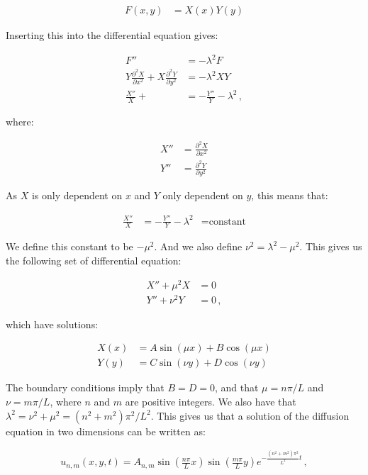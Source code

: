 \documentclass[reprint,english,notitlepage]{revtex4-1}  %
\begin{document}
\begin{align*}
F(x,y) &= X(x) Y(y)
\end{align*}

Inserting this into the differential equation gives:

\begin{align*}
F'' &= -\lambda^2 F \\
Y \frac{\partial^2 X}{\partial x^2} + X \frac{\partial^2 Y}{\partial y^2} &= -\lambda^2 XY \\
\frac{X''}{X} +  &= - \frac{Y''}{Y} - \lambda^2 \, ,
\end{align*}

where:

\begin{align*}
X'' &= \frac{\partial^2 X}{\partial x^2} \\
Y'' &= \frac{\partial^2 Y}{\partial y^2}
\end{align*}

As $X$ is only dependent on $x$ and $Y$ only dependent on $y$, this means that:

\begin{align*}
\frac{X''}{X} &= - \frac{Y''}{Y} - \lambda^2 &= \text{constant}
\end{align*}

We define this constant to be $-\mu^2$. And we also define $\nu^2 = \lambda^2 - \mu^2$. This gives us the following set of differential equation:

\begin{align*}
X'' + \mu^2 X &= 0 \\
Y'' + \nu^2 Y &= 0 \, ,
\end{align*}  

which have solutions:

\begin{align*}
X(x) &= A \sin(\mu x) + B\cos(\mu x) \\
Y(y) &= C \sin (\nu y) + D \cos (\nu y)
\end{align*}

The boundary conditions imply that $B=D=0$, and that $\mu = n\pi/L$ and $\nu = m\pi/L$, where $n$ and $m$ are positive integers. We also have that $\lambda^2 = \nu^2 + \mu^2 = (n^2+m^2) \pi^2/L^2$. This gives us that a solution of the diffusion equation in two dimensions can be written as:

\begin{align*}
u_{n,m}(x,y,t) = A_{n,m} \sin (\frac{n\pi}{L} x)  \sin (\frac{m\pi}{L} y) e^{-\frac{(n^2 + m^2)\pi^2}{L^2} t} \, ,
\end{align*}
\end{document}

